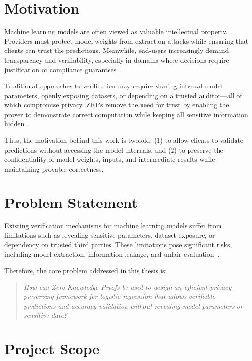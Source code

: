 \section{Motivation}

Machine learning models are often viewed as valuable intellectual property. Providers must protect model weights from extraction attacks while ensuring that clients can trust the predictions. Meanwhile, end-users increasingly demand transparency and verifiability, especially in domains where decisions require justification or compliance guarantees~\cite{article}.

Traditional approaches to verification may require sharing internal model parameters, openly exposing datasets, or depending on a trusted auditor—all of which compromise privacy. ZKPs remove the need for trust by enabling the prover to demonstrate correct computation while keeping all sensitive information hidden~\cite{kates2020plonk}.

Thus, the motivation behind this work is twofold:  
(1) to allow clients to validate predictions without accessing the model internals, and  
(2) to preserve the confidentiality of model weights, inputs, and intermediate results while maintaining provable correctness.

\section{Problem Statement}

Existing verification mechanisms for machine learning models suffer from limitations such as revealing sensitive parameters, dataset exposure, or dependency on trusted third parties. These limitations pose significant risks, including model extraction, information leakage, and unfair evaluation~\cite{10.1145/3372297.3417278}.  

Therefore, the core problem addressed in this thesis is:

\begin{quote}
\textit{How can Zero-Knowledge Proofs be used to design an efficient privacy-preserving framework for logistic regression that allows verifiable predictions and accuracy validation without revealing model parameters or sensitive data?}
\end{quote}

\section{Project Scope}

